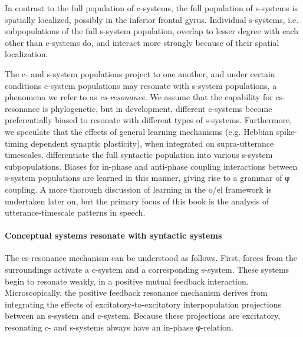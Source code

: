   In contrast to the full population of c-systems, the full population of s-systems is spatially localized, possibly in the inferior frontal gyrus. Individual s-systems, i.e. subpopulations of the full s-system population, overlap to lesser degree with each other than c-systems do, and interact more strongly because of their spatial localization. 

  The c- and s-system populations project to one another, and under certain conditions c-system populations may resonate with s-system populations, a phenomena we refer to as \textit{cs-resonance}. We assume that the capability for cs-resonance is phylogenetic, but in development, different c-systems become preferentially biased to resonate with different types of s-systems. Furthermore, we speculate that the effects of general learning mechanisms (e.g. Hebbian spike-timing dependent synaptic plasticity), when integrated on supra-utterance timescales, differentiate the full syntactic population into various s-system subpopulations. Biases for in-phase and anti-phase coupling interactions between s-system populations are learned in this manner, giving rise to a grammar of φ coupling. A more thorough discussion of learning in the o/el framework is undertaken later on, but the primary focus of this book is the analysis of utterance-timescale patterns in speech.

\paragraph{Conceptual systems resonate with syntactic systems}

The cs-resonance mechanism can be understood as follows. First, forces from the surroundings activate a c-system and a corresponding s-system. These systems begin to resonate weakly, in a positive mutual feedback interaction. Microscopically, the positive feedback resonance mechanism derives from integrating the effects of excitatory-to-excitatory interpopulation projections between an s-system and c-system. Because these projections are excitatory, resonating c- and s-systems always have an in-phase φ-relation. 

